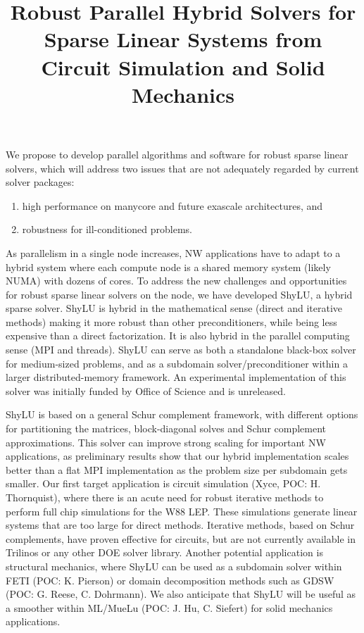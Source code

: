 \documentclass[10pt]{amsart}
\date{}
\title{Robust Parallel Hybrid Solvers for Sparse Linear Systems
from Circuit Simulation and Solid Mechanics}
\begin{document}
\maketitle

\vspace{-4mm}
We propose to develop parallel algorithms and software for robust sparse linear solvers,
which will address two issues that are not adequately regarded by current solver packages:
\begin{enumerate}
\item high performance on manycore and future exascale architectures, and
\item robustness for ill-conditioned problems.
\end{enumerate}

As parallelism in a single node increases, NW applications
have to adapt to a hybrid system where each compute node 
is a shared memory system (likely NUMA) with dozens of cores. 
To address the new challenges and opportunities 
for robust sparse linear solvers on the node,
we have developed ShyLU, a hybrid sparse solver. 
ShyLU is hybrid in the
mathematical sense (direct and iterative methods) making it more
robust than other preconditioners, while being less expensive
than a direct factorization.  It is also hybrid in the parallel
computing sense (MPI and threads).  ShyLU can serve as both
a standalone black-box solver for medium-sized problems,
and as a subdomain solver/preconditioner within a larger 
distributed-memory framework. 
An experimental implementation of
this solver was initially funded by Office of Science and is unreleased. 

ShyLU is based on a general Schur complement framework, with different options
for partitioning the matrices, block-diagonal solves and Schur complement
approximations.  This solver can improve strong scaling for important NW 
applications, as preliminary results show that our hybrid implementation scales better than
a flat MPI implementation as the problem size per subdomain gets smaller.
Our first target application is circuit simulation (Xyce, POC: H. Thornquist), 
where there is an acute need for robust iterative methods to perform full chip simulations
for the W88 LEP.  These simulations generate linear systems that are too large for
direct methods.
Iterative methods, based on Schur complements, have proven effective for circuits, but
are not currently available in Trilinos or any other DOE solver library.
%
Another potential application is structural mechanics, where ShyLU
can be used as a subdomain solver within FETI (POC: K. Pierson) or
domain decomposition methods such as GDSW (POC: G. Reese, C. Dohrmann). 
We also anticipate that ShyLU will be useful as a smoother within 
ML/MueLu (POC: J. Hu, C. Siefert) for solid mechanics applications.
\end{document}
